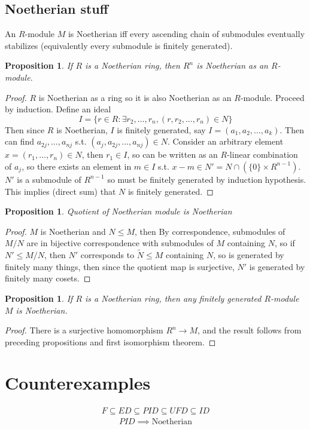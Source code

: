 \documentclass{article}
\theoremstyle{definition}
\theoremstyle{remark}
\theoremstyle{plain}
\newtheorem{prop}[defn]{Proposition}
\theoremstyle{definition}
\begin{document}
\subsection{Noetherian stuff}
An $R$-module $M$ is Noetherian iff every ascending chain of submodules eventually stabilizes (equivalently every submodule is finitely generated).
\begin{prop}
    If $R$ is a Noetherian ring, then $R^n$ is Noetherian as an $R$-module.
\end{prop}
\begin{proof}
    $R$ is Noetherian as a ring so it is also Noetherian as an $R$-module. Proceed by induction.
    Define an ideal
    \[I=\{r\in R:\exists r_2,\ldots,r_n, (r,r_2,...,r_n)\in N\}\]
    Then since $R$ is Noetherian, $I$ is finitely generated, say $I=(a_1,a_2,...,a_k)$.
    Then can find $a_{2j},\ldots,a_{nj}$ s.t. $(a_j,a_{2j},...,a_{nj})\in N$. Consider an arbitrary element $x=(r_1,\ldots,r_n)\in N$, then $r_1\in I$, so can be written as an $R$-linear combination of $a_j$, so there exists an element in $m\in I$ s.t. $x-m\in N'=N\cap(\{0\}\times R^{n-1})$. $N'$ is a submodule of $R^{n-1}$ so must be finitely generated by induction hypothesis. This implies (direct sum) that $N$ is finitely generated. 
\end{proof}

\begin{prop}
    Quotient of Noetherian module is Noetherian
\end{prop}
\begin{proof}
    $M$ is Noetherian and $N\le M$, then By correspondence, submodules of $M/N$ are in bijective correspondence with submodules of $M$ containing $N$, so if $N'\le M/N$, then $N'$ corresponds to $\tilde N\le M$ containing $N$, so is generated by finitely many things, then since the quotient map is surjective, $N'$ is generated by finitely many cosets.
\end{proof}

\begin{prop}
    If $R$ is a Noetherian ring, then any finitely generated $R$-module $M$ is Noetherian.
\end{prop}
\begin{proof}
    There is a surjective homomorphism $R^n\to M$, and the result follows from preceding propositions and first isomorphism theorem. 
\end{proof}



\section{Counterexamples}
\begin{align*}
    F\subseteq ED\subseteq PID\subseteq UFD\subseteq ID
\end{align*}
\begin{align*}
    PID\implies\text{Noetherian}
\end{align*}
\end{document}
